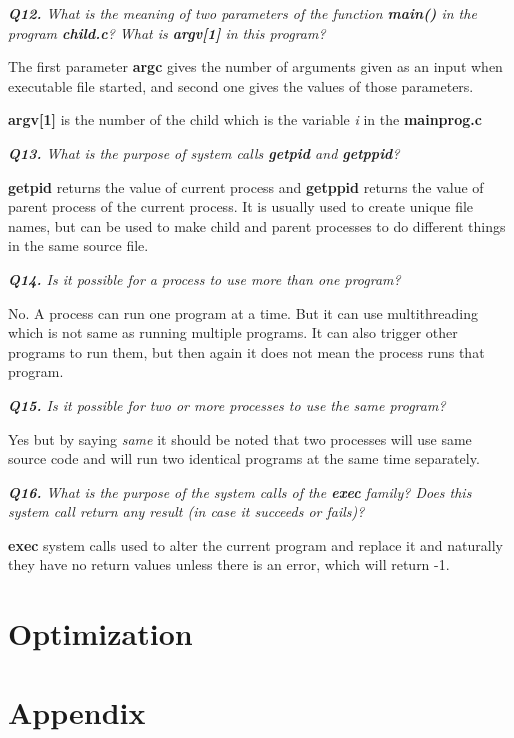 \documentclass[11pt]{article}
\begin{document}
\vspace{5mm}
\textit{\textbf{Q12.} What is the meaning of two parameters of the function \textbf{main()} in the program \textbf{child.c}? What is \textbf{argv[1]} in this program?}
\vspace{5mm}

The first parameter \textbf{argc} gives the number of arguments given as an input when executable file started, and second one gives the values of those parameters. 

\textbf{argv[1]} is the number of the child which is the variable \textit{i} in the \textbf{mainprog.c}

\vspace{5mm}
\textit{\textbf{Q13.} What is the purpose of system calls \textbf{getpid} and \textbf{getppid}?}
\vspace{5mm}

 \textbf{getpid} returns the value of current process and  \textbf{getppid} returns the value of parent process of the current process. It is usually used to create unique file names, but can be used to make child and parent processes to do different things in the same source file.

\vspace{5mm}
\textit{\textbf{Q14.} Is it possible for a process to use more than one program?}
\vspace{5mm}

No. A process can run one program at a time. But it can use multithreading which is not same as running multiple programs. It can also trigger other programs to run them, but then again it does not mean the process runs that program.

\vspace{5mm}
\textit{\textbf{Q15.} Is it possible for two or more processes to use the same program?}
\vspace{5mm}

Yes but by saying \textit{same} it should be noted that two processes will use same source code and will run two identical programs at the same time separately.

\vspace{5mm}
\textit{\textbf{Q16.} What is the purpose of the system calls of the \textbf{exec} family? Does this system call return any result (in case it succeeds or fails)?}
\vspace{5mm}

\textbf{exec} system calls used to alter the current program and replace it and naturally they have no return values unless there is an error, which will return -1.

\section*{Optimization}

\newpage

\section*{Appendix}
\end{document}
